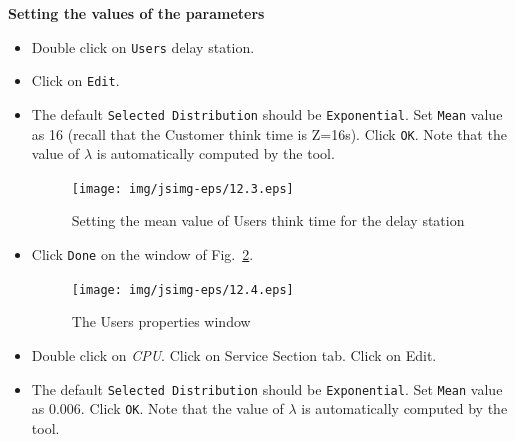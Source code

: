 \noindent \textbf{Setting the values of the parameters}
\begin{itemize} \item
Double click on \texttt{Users} delay station. \item  Click on
\texttt{Edit}. \item The default \texttt{Selected Distribution}
should be \texttt{Exponential}. Set \texttt{Mean} value as 16
(recall that the Customer think time is Z=16s). Click \texttt{OK}.
Note that the value of $\lambda$ is automatically computed by the
tool.

\begin{figure}[htb]
    \begin{center}
        \texttt{[image: img/jsimg-eps/12.3.eps]}
    \end{center}
    \caption{Setting the mean value of Users think time for the delay station}
    \label{fig:meanthin}
\end{figure}
\item Click \texttt{Done} on the window of
Fig.~\ref{fig:uspropwin}.
\begin{figure}[htb]
    \begin{center}
        \texttt{[image: img/jsimg-eps/12.4.eps]}
    \end{center}
    \caption{The Users properties window}
    \label{fig:uspropwin}
\end{figure}
\item Double click on \emph{CPU}. Click on Service Section tab.
Click on Edit. \item The default \texttt{Selected Distribution}
should be \texttt{Exponential}. Set \texttt{Mean} value as 0.006.
Click \texttt{OK}. Note that the value of $\lambda$ is
automatically computed by the tool.


\end{itemize}

